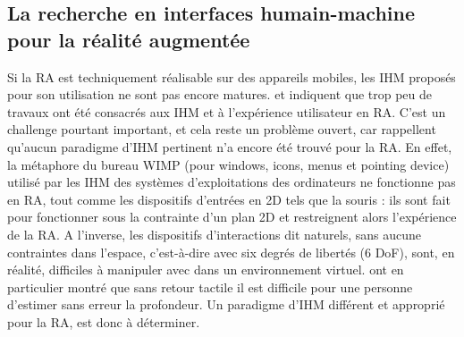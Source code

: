 \subsection{La recherche en interfaces humain-machine pour la réalité augmentée}
Si la RA est techniquement réalisable sur des appareils mobiles, les IHM proposés pour son utilisation ne sont pas encore matures. \citet{ZhouDuhBillinghurst2008} et \citet{DeSaChurchill2013} indiquent que trop peu de travaux ont été consacrés aux IHM et à l'expérience utilisateur en RA. C'est un challenge pourtant important, et cela reste un problème ouvert, car \citet{VanKrevelenPoelman2010} rappellent qu'aucun paradigme d'IHM pertinent n'a encore été trouvé pour la RA. En effet, la métaphore du bureau WIMP (pour \foreignlanguage{english}{windows}, \foreignlanguage{english}{icons}, \foreignlanguage{english}{menus} et \foreignlanguage{english}{pointing device}) utilisé par les IHM des systèmes d'exploitations des ordinateurs ne fonctionne pas en RA, tout comme les dispositifs d'entrées en 2D tels que la souris : ils sont fait pour fonctionner sous la contrainte d'un plan 2D et restreignent alors l'expérience de la RA. \citep{VanKrevelenPoelman2010} A l'inverse, les dispositifs d'interactions dit naturels, sans aucune contraintes dans l'espace, c'est-à-dire avec six degrés de libertés (6 DoF), sont, en réalité, difficiles à manipuler avec dans un environnement virtuel. \citet{ChanKaoChenEtAl2010} ont en particulier montré que sans retour tactile il est difficile pour une personne d'estimer sans erreur la profondeur. Un paradigme d'IHM différent et approprié pour la RA, est donc à déterminer.

